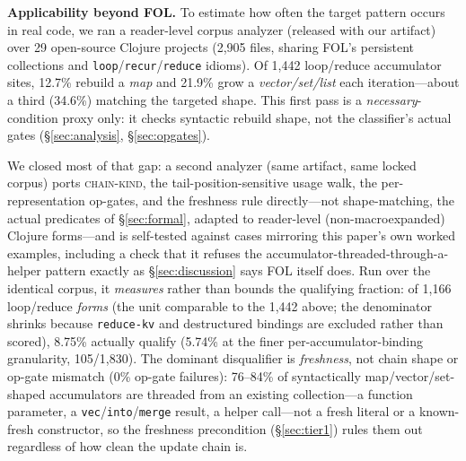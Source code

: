 \documentclass[sigplan,review,anonymous]{acmart}
\begin{document}
\textbf{Applicability beyond FOL.} To estimate how often the target pattern occurs in real code, we ran a reader-level corpus analyzer (released with our artifact) over 29 open-source Clojure projects (2{,}905 files, sharing FOL's persistent collections and \texttt{loop}/\texttt{recur}/\texttt{reduce} idioms). Of 1{,}442 loop/reduce accumulator sites, 12.7\% rebuild a \emph{map} and 21.9\% grow a \emph{vector/set/list} each iteration---about a third (34.6\%) matching the targeted shape. This first pass is a \emph{necessary}-condition proxy only: it checks syntactic rebuild shape, not the classifier's actual gates (§\ref{sec:analysis}, §\ref{sec:opgates}).

We closed most of that gap: a second analyzer (same artifact, same locked corpus) ports \textsc{chain-kind}, the tail-position-sensitive usage walk, the per-representation op-gates, and the freshness rule directly---not shape-matching, the actual predicates of §\ref{sec:formal}, adapted to reader-level (non-macroexpanded) Clojure forms---and is self-tested against cases mirroring this paper's own worked examples, including a check that it refuses the accumulator-threaded-through-a-helper pattern exactly as §\ref{sec:discussion} says FOL itself does. Run over the identical corpus, it \emph{measures} rather than bounds the qualifying fraction: of 1{,}166 loop/reduce \emph{forms} (the unit comparable to the 1{,}442 above; the denominator shrinks because \texttt{reduce-kv} and destructured bindings are excluded rather than scored), 8.75\% actually qualify (5.74\% at the finer per-accumulator-binding granularity, 105/1{,}830). The dominant disqualifier is \emph{freshness}, not chain shape or op-gate mismatch (0\% op-gate failures): 76--84\% of syntactically map/vector/set-shaped accumulators are threaded from an existing collection---a function parameter, a \texttt{vec}/\texttt{into}/\texttt{merge} result, a helper call---not a fresh literal or a known-fresh constructor, so the freshness precondition (§\ref{sec:tier1}) rules them out regardless of how clean the update chain is.
\end{document}

